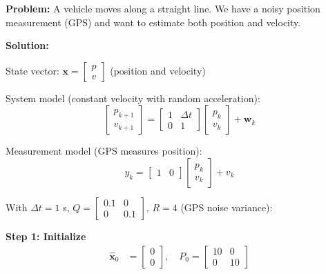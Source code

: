 \begin{examplebox}
\textbf{Problem:} A vehicle moves along a straight line. We have a noisy position measurement (GPS) and want to estimate both position and velocity.

\textbf{Solution:}

State vector: $\mathbf{x} = \begin{bmatrix} p \\ v \end{bmatrix}$ (position and velocity)

System model (constant velocity with random acceleration):
\begin{equation}
\begin{bmatrix} p_{k+1} \\ v_{k+1} \end{bmatrix} =
\begin{bmatrix} 1 & \Delta t \\ 0 & 1 \end{bmatrix}
\begin{bmatrix} p_k \\ v_k \end{bmatrix} + \mathbf{w}_k
\end{equation}

Measurement model (GPS measures position):
\begin{equation}
y_k = \begin{bmatrix} 1 & 0 \end{bmatrix} \begin{bmatrix} p_k \\ v_k \end{bmatrix} + v_k
\end{equation}

With $\Delta t = 1$ s, $Q = \begin{bmatrix} 0.1 & 0 \\ 0 & 0.1 \end{bmatrix}$, $R = 4$ (GPS noise variance):

\textbf{Step 1: Initialize}
\begin{align}
\hat{\mathbf{x}}_0 &= \begin{bmatrix} 0 \\ 0 \end{bmatrix}, \quad
P_0 = \begin{bmatrix} 10 & 0 \\ 0 & 10 \end{bmatrix}
\end{align}


\end{examplebox}
